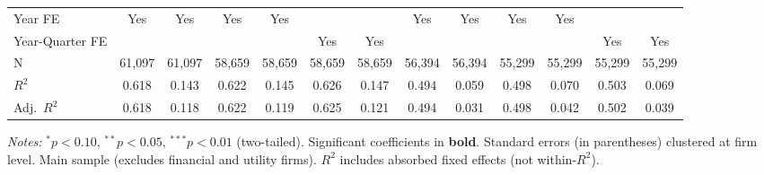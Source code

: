\documentclass[11pt,a4paper]{article}
\begin{document}
\begin{table}[htbp]
\begin{tabular}{lcccccccccccc}
Year FE & Yes & Yes & Yes & Yes &  &  & Yes & Yes & Yes & Yes &  &  \\
Year-Quarter FE &  &  &  &  & Yes & Yes &  &  &  &  & Yes & Yes \\
\midrule
N & 61,097 & 61,097 & 58,659 & 58,659 & 58,659 & 58,659 & 56,394 & 56,394 & 55,299 & 55,299 & 55,299 & 55,299 \\
$R^2$ & 0.618 & 0.143 & 0.622 & 0.145 & 0.626 & 0.147 & 0.494 & 0.059 & 0.498 & 0.070 & 0.503 & 0.069 \\
Adj.~$R^2$ & 0.618 & 0.118 & 0.622 & 0.119 & 0.625 & 0.121 & 0.494 & 0.031 & 0.498 & 0.042 & 0.502 & 0.039 \\
\bottomrule
\end{tabular}
\begin{minipage}{\linewidth}
\vspace{2pt}\scriptsize
\textit{Notes:} $^{*}p<0.10$, $^{**}p<0.05$, $^{***}p<0.01$ (two-tailed).
 Significant coefficients in \textbf{bold}.
 Standard errors (in parentheses) clustered at firm level.
 Main sample (excludes financial and utility firms).
 $R^2$ includes absorbed fixed effects (not within-$R^2$).
\end{minipage}
\end{table}
\clearpage
\end{document}
